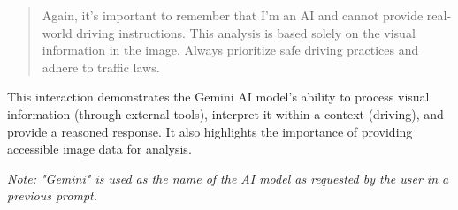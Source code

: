 \begin{enumerate}
\begin{quote}
Again, it's important to remember that I'm an AI and cannot provide real-world driving instructions. This analysis is based solely on the visual information in the image. Always prioritize safe driving practices and adhere to traffic laws.

    \end{quote}
\end{enumerate}

This interaction demonstrates the Gemini AI model's ability to process visual information (through external tools), interpret it within a context (driving), and provide a reasoned response. It also highlights the importance of providing accessible image data for analysis.

\textit{Note: "Gemini" is used as the name of the AI model as requested by the user in a previous prompt.}








